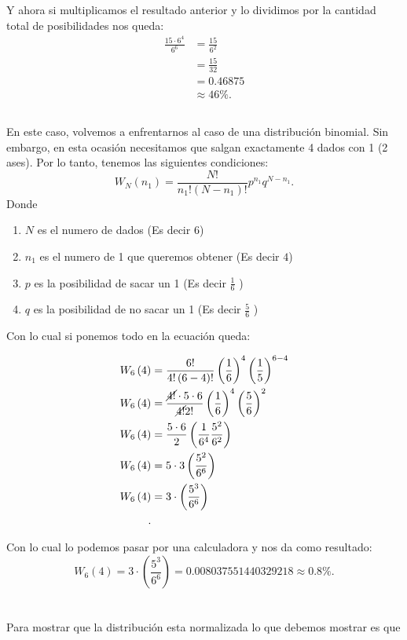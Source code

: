 \documentclass{report}
\begin{document}
Y ahora si multiplicamos el resultado anterior y lo dividimos por la cantidad total de posibilidades nos queda:
\begin{align*}
  \frac{15 \cdot 6^{4}}{6^{6}} &= \frac{15}{6^{2}} \\
  &= \frac{15}{32} \\
  &= 0.46875 \\
  &\approx 46\%
.\end{align*}

\section{}

En este caso, volvemos a enfrentarnos al caso de una distribución binomial. Sin embargo, en esta ocasión necesitamos que salgan exactamente 4 dados con 1 (2 ases). Por lo tanto, tenemos las siguientes condiciones: \[
W_N\left( n_1 \right) = \frac{N!}{n_1!\left( N-n_1 \right)!}p^{n_1}q^{N - n_1}
.\] Donde
\begin{enumerate}
  \item $N$ es el numero de dados (Es decir $6$)
  \item $n_1$ es el numero de 1 que queremos obtener (Es decir $4$)
  \item $p$ es la posibilidad de sacar un 1 (Es decir $\frac{1}{6}$ )
  \item $q$ es la posibilidad de no sacar un 1 (Es decir  $\frac{5}{6}$ )
\end{enumerate}

Con lo cual si ponemos todo en la ecuación queda:

\begin{align*}
  W_6\left( 4 \right) &= \frac{6!}{4!\left( 6 - 4 \right)!}\left( \frac{1}{6} \right) ^{4} \left( \frac{1}{5} \right) ^{6-4} \\
  W_6\left( 4 \right) &= \frac{\cancel{4!} \cdot 5 \cdot 6}{\cancel{4!}2!}\left( \frac{1}{6} \right)^{4}\left( \frac{5}{6} \right)^{2} \\
  W_6\left( 4 \right) &= \frac{5\cdot 6}{2}\left( \frac{1}{6^{4}}\frac{5^2}{6^2} \right)  \\
  W_6\left( 4 \right) &= 5\cdot 3 \left( \frac{5^2}{6^{6}} \right)  \\
  W_6\left( 4 \right) &= 3\cdot \left( \frac{5^{3}}{6^{6}} \right)  \\
.\end{align*}

Con lo cual lo podemos pasar por una calculadora y nos da como resultado: \[
W_6\left( 4 \right) = 3 \cdot \left( \frac{5^{3}}{6^{6}} \right) = 0.008037551440329218 \approx 0.8\%
.\] 

\chapter{}

\section{}

Para mostrar que la distribución esta normalizada lo que debemos mostrar es que
\end{document}
